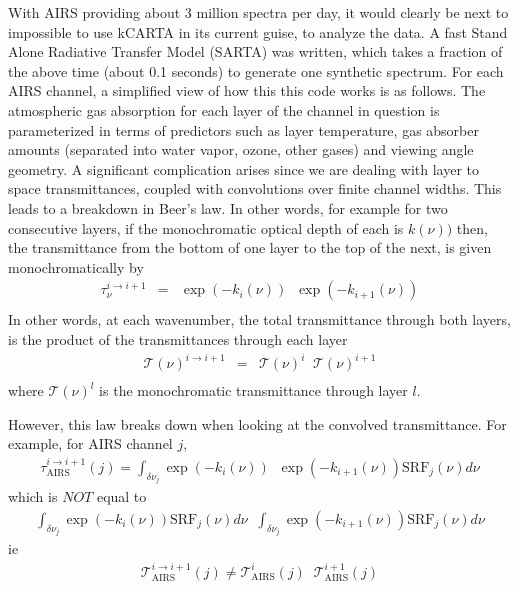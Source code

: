 \documentclass[11pt]{article}
\newcommand{\kc}{\textsf{kCARTA}\xspace}
\begin{document}
With AIRS providing about 3 million spectra per day, it would clearly
be next to impossible to use \kc in its current guise, to analyze the
data. A fast Stand Alone Radiative Transfer Model (SARTA) was written,
which takes a fraction of the above time (about 0.1 seconds) to
generate one synthetic spectrum. For each AIRS channel, a simplified
view of how this this code works is as follows. The atmospheric gas
absorption for
each layer of the channel in question is parameterized in terms of
predictors such as layer temperature, gas absorber amounts (separated
into water vapor, ozone, other gases) and viewing angle geometry. A
significant complication arises since we are dealing with layer to
space transmittances, coupled with convolutions over finite channel
widths. This leads to a breakdown in Beer's law. In other words, for
example for two consecutive layers, if the monochromatic optical depth
of each is $k(\nu))$ then, the transmittance from the bottom of one
layer to the top of the next, is given monochromatically by
\begin{eqnarray*}
  \tau_{\nu}^{i \rightarrow i+1} & = & \exp(-k_{i}(\nu)) \;\; \exp(-k_{i+1}(\nu)) \\
\end{eqnarray*}
In other words, at each wavenumber, the total transmittance through
both layers, is the product of the transmittances through each layer
\begin{eqnarray*}
  \mathcal{T}(\nu)^{i \rightarrow i+1}           & = &  \mathcal{T}(\nu)^{i} \;\;  \mathcal{T}(\nu)^{i+1}\\
\end{eqnarray*}
where $\mathcal{T}(\nu)^{l}$ is the monochromatic transmittance
through layer $l$.

However, this law breaks down when looking at the convolved
transmittance. For example, for AIRS channel $j$,
\begin{eqnarray*}
  \tau_{\text{AIRS}}^{i \rightarrow i+1}(j) = \int_{\delta \nu_{j}} \exp(-k_{i}(\nu)) \;\; \exp(-k_{i+1}(\nu)) \text{SRF}_{j}(\nu) d\nu
\end{eqnarray*}
which is $NOT$ equal to
\begin{eqnarray*}
  \int_{\delta \nu_{j}} \exp(-k_{i}(\nu)) \text{SRF}_{j}(\nu) d\nu \;\; \int_{\delta \nu_{j}} \exp(-k_{i+1}(\nu)) \text{SRF}_{j}(\nu) d\nu
\end{eqnarray*}
ie
\begin{eqnarray*}
  \mathcal{T}_{\text{AIRS}}^{i \rightarrow i+1}(j) \ne  \mathcal{T}_{\text{AIRS}}^{i}(j) \;\; \mathcal{T}_{\text{AIRS}}^{i+1}(j)
\end{eqnarray*}
\end{document}
